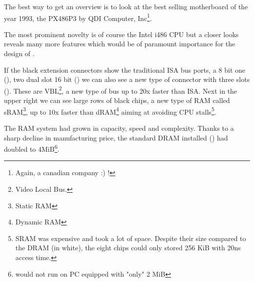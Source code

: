 \cleartoleftpage
 The best way to get an overview is to look at the best selling motherboard of the year 1993, the PX486P3 by QDI Computer, Inc\footnote{Again, a canadian company :) !}.\\
\par

\par
The most prominent novelty is of course the Intel i486 CPU but a closer looks reveals many more features which would be of paramount importance for the design of \doom.\\
\par 
If the black extension connectors show the traditional ISA bus ports, a 8 bit one (), two dual slot 16 bit () we can also see a new type of connector with three slots (). These are VBL\footnote{Video Local Bus.}, a new type of bus up to 20x faster than ISA. Next in the upper right we can see large rows of black chips, a new type of RAM called sRAM\footnote{Static RAM}, up to 10x faster than dRAM\footnote{Dynamic RAM} aiming at avoiding CPU stalls\footnote{SRAM was expensive and took a lot of space. Despite their size compared to the DRAM (in white), the eight chips could only stored 256 KiB with 20ns access time.}. \\
\par
{}
\par
The RAM system had grown in capacity, speed and complexity. Thanks to a sharp decline in manufacturing price, the standard DRAM installed () had doubled to 4MiB\footnote{\doom would not run on PC equipped with "only" 2 MiB}.\\
\par

